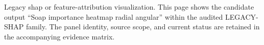 Legacy shap or feature-attribution visualization. This page shows the candidate output ``Soap importance heatmap radial angular'' within the audited LEGACY-SHAP family. The panel identity, source scope, and current status are retained in the accompanying evidence matrix.

